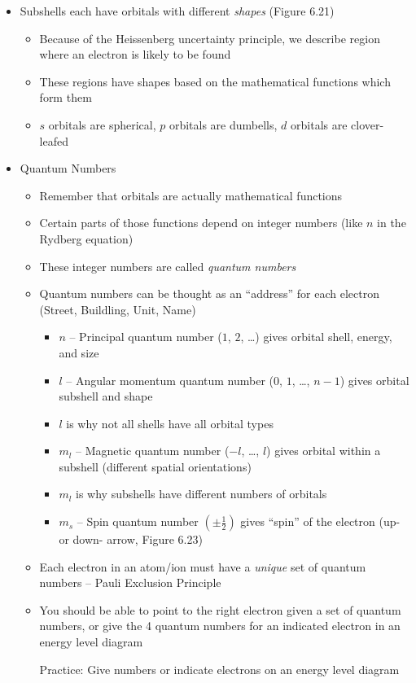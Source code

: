 \documentclass[12pt, openany, letterpaper]{memoir}
\begin{document}
\begin{itemize}
	      ~\hphantom{Practice:} How many electron can be placed in the  shell? ($18$)

	      ~\hphantom{Practice:} Which of the following subshells does \emph{not} exist? $2s$, $3f$, $3p$, $5d$ ($3f$)
	\item Subshells each have orbitals with different \emph{shapes} (Figure 6.21)
	      \begin{itemize}
		      \item Because of the Heissenberg uncertainty principle, we describe region where an electron is likely to be found
		      \item These regions have shapes based on the mathematical functions which form them
		      \item $s$ orbitals are spherical, $p$ orbitals are dumbells, $d$ orbitals are clover-leafed
	      \end{itemize}
  \item Quantum Numbers
    \begin{itemize}
      \item Remember that orbitals are actually mathematical functions
      \item Certain parts of those functions depend on integer numbers (like $n$ in the Rydberg equation)
      \item These integer numbers are called \emph{quantum numbers}
      \item Quantum numbers can be thought as an ``address'' for each electron (Street, Buildling, Unit, Name)
        \begin{itemize}
          \item $n$ -- Principal quantum number ($1$, $2$, \ldots) gives orbital shell, energy, and size
          \item $l$ -- Angular momentum quantum number ($0$, $1$, \ldots, $n-1$) gives orbital subshell and shape
          \item $l$ is why not all shells have all orbital types
          \item $m_l$ -- Magnetic quantum number ($-l$, \ldots, $l$) gives orbital within a subshell (different spatial orientations)
          \item $m_l$ is why subshells have different numbers of orbitals
          \item $m_s$ -- Spin quantum number $\left(\pm \frac{1}{2}\right)$ gives ``spin'' of the electron (up- or down- arrow, Figure 6.23)
        \end{itemize}
      \item Each electron in an atom/ion must have a \emph{unique} set of quantum numbers -- Pauli Exclusion Principle
      \item You should be able to point to the right electron given a set of quantum numbers, or give the 4 quantum numbers for an indicated electron in an energy level diagram

            Practice: Give numbers or indicate electrons on an energy level diagram
    \end{itemize}
\end{itemize}
\end{document}
